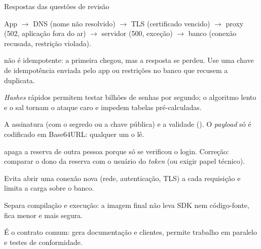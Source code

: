 \documentclass[aspectratio=169,10pt]{beamer}
\begin{document}
\begin{frame}{Respostas das questões de revisão}
  \begin{respostas}
    \item App $\rightarrow$ DNS (nome não resolvido) $\rightarrow$ TLS (certificado vencido) $\rightarrow$ proxy (502, aplicação fora do ar) $\rightarrow$ servidor (500, exceção) $\rightarrow$ banco (conexão recusada, restrição violada).
    \item {} não é idempotente: a primeira chegou, mas a resposta se perdeu. Use uma chave de idempotência enviada pelo app ou restrições no banco que recusem a duplicata.
    \item \emph{Hashes} rápidos permitem testar bilhões de senhas por segundo; o algoritmo lento e o sal tornam o ataque caro e impedem tabelas pré-calculadas.
    \item A assinatura (com o segredo ou a chave pública) e a validade (). O \emph{payload} só é codificado em Base64URL: qualquer um o lê.
    \item {} apaga a reserva de outra pessoa porque só se verificou o login. Correção: comparar o dono da reserva com o usuário do \emph{token} (ou exigir papel técnico).
    \item Evita abrir uma conexão nova (rede, autenticação, TLS) a cada requisição e limita a carga sobre o banco.
    \item Separa compilação e execução: a imagem final não leva SDK nem código-fonte, fica menor e mais segura.
    \item É o contrato comum: gera documentação e clientes, permite trabalho em paralelo e testes de conformidade.
  \end{respostas}
\end{frame}

\end{document}
